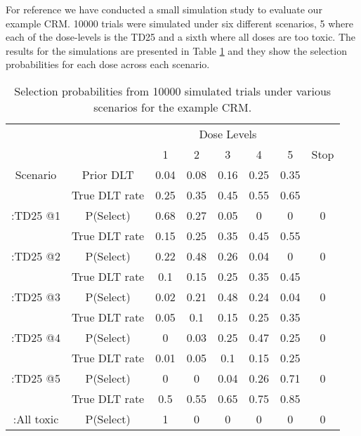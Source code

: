 For reference we have conducted a small simulation study to evaluate our example CRM. 10000 trials were simulated under six different scenarios, 5 where each of the dose-levels is the TD25 and a sixth where all doses are too toxic. The results for the simulations are presented in Table \ref{tab_tite-dtp:InitialCRMsimsexample} and they show the selection probabilities for each dose across each scenario. 

\begin{table}[H]
	
	\caption{\label{tab_tite-dtp:InitialCRMsimsexample}Selection probabilities from 10000 simulated trials under various scenarios for the example CRM.}
	\centering
	\begin{tabular}[t]{cccccccc}
		\toprule
		\multicolumn{2}{c}{ } & \multicolumn{5}{c}{Dose Levels} \\
		\cmidrule(l{3pt}r{3pt}){3-7}
		&   & 1 & 2 & 3 & 4 & 5 & Stop\\
		\midrule
		Scenario & Prior DLT & 0.04 & 0.08 & 0.16 & 0.25 & 0.35 & \\
		\cmidrule{1-8}
		& True DLT rate & 0.25 & 0.35 & 0.45 & 0.55 & 0.65 & \\
		
		\multirow{-2}{*}{\centering\arraybackslash 1:TD25 @1} & P(Select) & 0.68 & 0.27 & 0.05 & 0 & 0 & 0\\
		\cmidrule{1-8}
		& True DLT rate & 0.15 & 0.25 & 0.35 & 0.45 & 0.55 & \\
		
		\multirow{-2}{*}{\centering\arraybackslash 2:TD25 @2} & P(Select) & 0.22 & 0.48 & 0.26 & 0.04 & 0 & 0\\
		\cmidrule{1-8}
		& True DLT rate & 0.1 & 0.15 & 0.25 & 0.35 & 0.45 & \\
		
		\multirow{-2}{*}{\centering\arraybackslash 3:TD25 @3} & P(Select) & 0.02 & 0.21 & 0.48 & 0.24 & 0.04 & 0\\
		\cmidrule{1-8}
		& True DLT rate & 0.05 & 0.1 & 0.15 & 0.25 & 0.35 & \\
		
		\multirow{-2}{*}{\centering\arraybackslash 4:TD25 @4} & P(Select) & 0 & 0.03 & 0.25 & 0.47 & 0.25 & 0\\
		\cmidrule{1-8}
		& True DLT rate & 0.01 & 0.05 & 0.1 & 0.15 & 0.25 & \\
		
		\multirow{-2}{*}{\centering\arraybackslash 5:TD25 @5} & P(Select) & 0 & 0 & 0.04 & 0.26 & 0.71 & 0\\
		\cmidrule{1-8}
		& True DLT rate & 0.5 & 0.55 & 0.65 & 0.75 & 0.85 & \\
		
		\multirow{-2}{*}{\centering\arraybackslash 6:All toxic} & P(Select) & 1 & 0 & 0 & 0 & 0 & 0\\
		\bottomrule
	\end{tabular}
\end{table}

